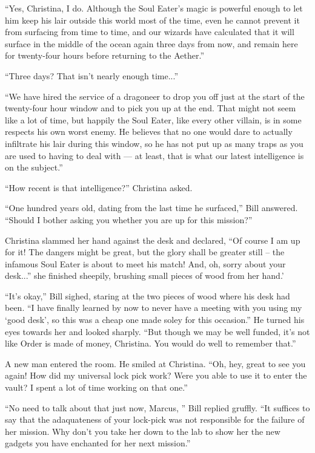 \documentclass[showtrims,b6paper,draft,10pt]{memoir}
\begin{document}
``Yes, Christina, I do.  Although the Soul Eater's magic is powerful enough to let him keep his lair outside this world most of the time, even he cannot prevent it from surfacing from time to time, and our wizards have calculated that it will surface in the middle of the ocean again three days from now, and remain here for twenty-four hours before returning to the Aether.''

``Three days?  That isn't nearly enough time...''

``We have hired the service of a dragoneer to drop you off just at the start of the twenty-four hour window and to pick you up at the end.  That might not seem like a lot of time, but happily the Soul Eater, like every other villain, is in some respects his own worst enemy.  He believes that no one would dare to actually infiltrate his lair during this window, so he has not put up as many traps as you are used to having to deal with --- at least, that is what our latest intelligence is on the subject.''

``How recent is that intelligence?''  Christina asked.

``One hundred years old, dating from the last time he surfaced,''  Bill answered.  ``Should I bother asking you whether you are up for this mission?''

Christina slammed her hand against the desk and declared, ``Of course I am up for it!  The dangers might be great, but the glory shall be greater still -- the infamous Soul Eater is about to meet his match!  And, oh, sorry about your desk...''  she finished sheepily, brushing small pieces of wood from her hand.'

``It's okay,'' Bill sighed, staring at the two pieces of wood where his desk had been.  ``I have finally learned by now to never have a meeting with you using my `good desk', so this was a cheap one made soley for this occasion.''  He turned his eyes towards her and looked sharply.  ``But though we may be well funded, it's not like Order is made of money, Christina.  You would do well to remember that.''

A new man entered the room.  He smiled at Christina.  ``Oh, hey, great to see you again!  How did my universal lock pick work?  Were you able to use it to enter the vault?  I spent a lot of time working on that one.''

``No need to talk about that just now, Marcus, '' Bill replied gruffly.  ``It suffices to say that the adaquateness of your lock-pick was not responsible for the failure of her mission.  Why don't you take her down to the lab to show her the new gadgets you have enchanted for her next mission.''
\end{document}
